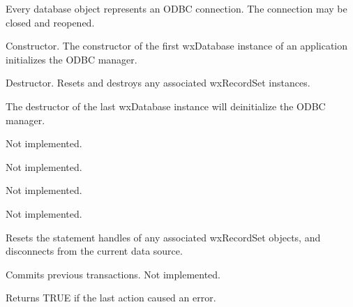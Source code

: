 
Every database object represents an ODBC connection. The connection may be closed and reopened.



Constructor. The constructor of the first wxDatabase instance of an
application initializes the ODBC manager.



Destructor. Resets and destroys any associated wxRecordSet instances.

The destructor of the last wxDatabase instance will deinitialize
the ODBC manager.



Not implemented.



Not implemented.


  
Not implemented.




Not implemented.



Resets the statement handles of any associated wxRecordSet objects,
and disconnects from the current data source.



Commits previous transactions. Not implemented.



Returns TRUE if the last action caused an error.


